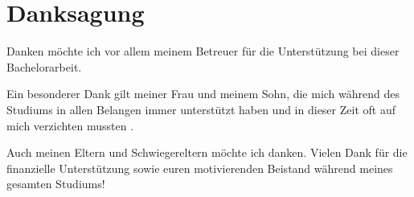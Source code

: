 \chapter*{Danksagung}
\thispagestyle{plain}
\pagestyle{plain}

Danken möchte ich vor allem meinem Betreuer für die Unterstützung bei dieser\\ Bachelorarbeit. 

Ein besonderer Dank gilt meiner Frau und meinem Sohn, die mich während des Studiums in allen Belangen immer unterstützt haben und in dieser Zeit oft auf mich verzichten mussten .

Auch meinen Eltern und Schwiegereltern möchte ich danken.  
Vielen Dank für die \\ finanzielle Unterstützung sowie euren motivierenden Beistand während meines gesamten Studiums!































